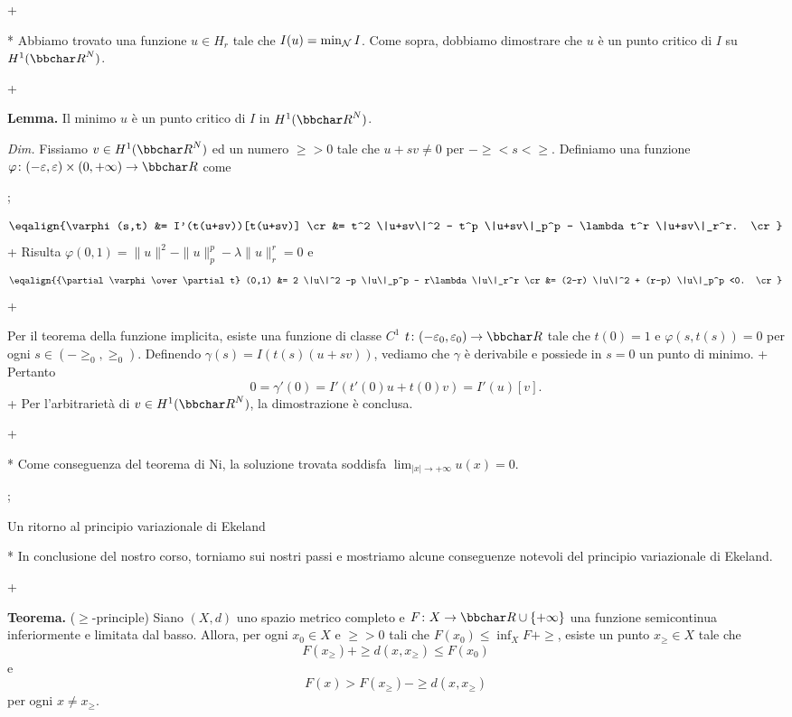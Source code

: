   \pg+
  
  * Abbiamo trovato una funzione $u \in H_r$ tale che $I(u) =
    \min_{\cal N} I$. Come sopra, dobbiamo dimostrare che $u$ \`e un
    punto critico di $I$ su $H^1(\R^N)$.
  
  \pg+
  
  {\bf Lemma.} Il minimo $u$ \`e un punto critico di $I$ in
  $H^1(\R^N)$.
  
  {\em Dim.} Fissiamo $v \in H^1(\R^N)$ ed un numero $\ge>0$ tale che
  $u+sv \neq 0$ per $-\ge<s<\ge$. Definiamo una funzione $\varphi
  \colon (-\ge,\ge) \times (0,+\infty) \to \R$ come
 
 \pg;
 
 $$
 \eqalign{%
 \varphi(s,t) &=  I'(t(u+sv))[t(u+sv)] \cr
 &= t^2 \|u+sv\|^2 - t^p \|u+sv\|_p^p - \lambda t^r \|u+sv\|_r^r. \cr
 }
 $$
 \pg+
 Risulta $\varphi(0,1)=\|u\|^2 - \|u\|_p^p - \lambda \|u\|_r^r=0$ e
 $$
 \eqalign{%
 {\partial \varphi \over \partial t} (0,1) &=  2 \|u\|^2 -p \|u\|_p^p - r\lambda \|u\|_r^r \cr
 &= (2-r) \|u\|^2 + (r-p) \|u\|_p^p <0. \cr
 }
 $$
 \pg+

Per il teorema della funzione implicita, esiste una funzione di classe
 $C^1$ $t \colon (-\ge_0,\ge_0) \to \R$ tale che $t(0)=1$ e
 $\varphi(s,t(s))=0$ per ogni $s \in (-\ge_0,\ge_0)$. Definendo
 $\gamma(s) = I(t(s)(u+sv))$, vediamo che $\gamma$ \`e derivabile e
 possiede in $s=0$ un punto di minimo.  \pg+ Pertanto
 $$
0= \gamma'(0)= I'(t'(0)u+t(0)v) = I'(u)[v].
$$
\pg+
Per l'arbitrariet\`a di $v \in H^1(\R^N)$, la dimostrazione \`e conclusa.

\pg+

* Come conseguenza del teorema di Ni, la soluzione trovata soddisfa
  $\lim_{|x| \to +\infty} u(x) =0$.

\pg;

\sec Un ritorno al principio variazionale di Ekeland

* In conclusione del nostro corso, torniamo sui nostri passi e
  mostriamo alcune conseguenze notevoli del principio variazionale di
  Ekeland.

\pg+

{\bf Teorema.} ($\ge$-principle) Siano $(X,d)$ uno spazio metrico
completo e $F \colon X \to \R \cup \{+\infty\}$ una funzione
semicontinua inferiormente e limitata dal basso. Allora, per ogni $x_0
\in X$ e $\ge>0$ tali che $F(x_0) \leq \inf_X F+\ge$, esiste un punto
$x_\ge \in X$ tale che
$$
F(x_\ge) + \ge d(x,x_\ge) \leq F(x_0)
$$
e
$$
F(x) > F(x_\ge) - \ge d(x,x_\ge)
$$
per ogni $x \neq x_\ge$.

